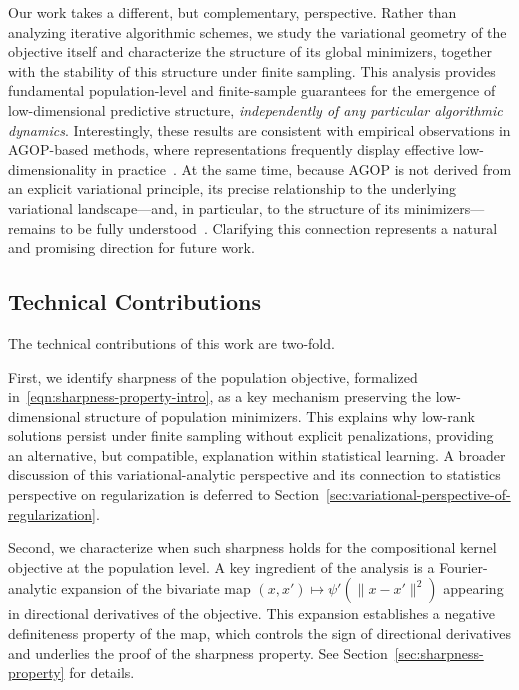 \documentclass[sn-mathphys-num]{sn-jnl}%
\numberwithin{equation}{section}
\theoremstyle{thmstyleone}%
\theoremstyle{thmstyletwo}%
\theoremstyle{thmstylethree}%
\begin{document}
\begin{itemize}
Our work takes a different, but complementary, perspective. Rather than analyzing iterative algorithmic schemes, we study the variational geometry of the objective itself and characterize the structure of its global minimizers, together with the stability of this structure under finite sampling. This analysis provides fundamental population-level and finite-sample guarantees for the emergence of low-dimensional predictive structure, \emph{independently of any particular algorithmic dynamics}. Interestingly, these results are consistent with empirical observations in AGOP-based methods, where representations frequently display effective low-dimensionality in practice~\cite{RadhakrishnanBeDr25}.  At the same time, because AGOP is not derived from an explicit variational principle, its precise relationship to the underlying variational landscape—and, in particular, to the structure of its minimizers—remains to be fully understood~\cite{RadhakrishnanBeDr25}. Clarifying this connection represents a natural and promising direction for future work.
\end{itemize}





\subsection{Technical Contributions} 
The technical contributions of this work are two-fold.

First, we identify sharpness of the population objective, formalized in~\eqref{eqn:sharpness-property-intro}, as a key mechanism preserving the low-dimensional structure of population minimizers. This explains why low-rank solutions persist under finite sampling without explicit penalizations, providing an alternative, but compatible, explanation within statistical learning. A broader discussion of this variational-analytic perspective and its connection to statistics perspective on regularization is deferred to Section~\ref{sec:variational-perspective-of-regularization}. 

Second, we characterize when such sharpness holds for the compositional kernel objective at the population level. A key ingredient of the analysis is a Fourier-analytic expansion of the bivariate map $(x,x') \mapsto \psi'(\|x-x'\|^2)$ appearing in directional derivatives of the objective. This expansion establishes a negative definiteness property of the map, which controls the sign of directional derivatives and underlies the proof of the sharpness property. See Section~\ref{sec:sharpness-property} for details.
\end{document}
